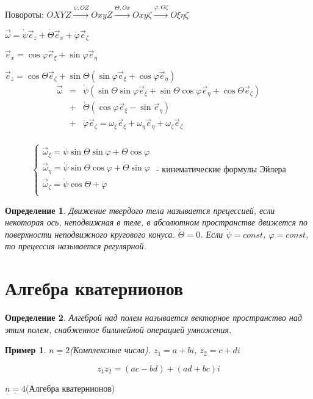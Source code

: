 \documentclass{article}
\newtheorem*{df}{Определение}
\newtheorem*{xmp}{Пример}
\begin{document}
  Повороты:
  $ OXYZ \xrightarrow{\psi, OZ} OxyZ \xrightarrow{\Theta, Ox} Oxy\zeta \xrightarrow{\varphi, O\zeta} O\xi\eta\zeta $

  $\vec{\omega} = \dot{\psi}\vec{e}_z + \dot{\Theta}\vec{e}_x + \dot{\varphi}\vec{e}_{\zeta}$

  $\vec{e}_x = \cos \varphi \vec{e}_{\xi} + \sin \varphi \vec{e}_{\eta}$
  
  $\vec{e}_z = \cos \Theta \vec{e}_{\zeta} + \sin \Theta ( \sin \varphi \vec{e}_{\xi} + \cos \varphi \vec{e}_{\eta} )$
  $$\begin{array}{rcl}\vec{\omega} & = & \dot\psi(\sin \Theta \sin \varphi \vec{e}_{\xi} + \sin \Theta \cos \varphi \vec{e}_{\eta} + \cos \Theta \vec{e}_{\zeta}) \\
  & + & \dot \Theta (\cos \varphi \vec{e}_{\xi} - \sin \vec{e}_{\eta}) \\
  & + & \dot{\varphi}\vec{e}_{\zeta} = \omega_{\xi}\vec{e}_{\xi} + \omega_{\eta}\vec{e}_{\eta} + \omega_{\zeta}\vec{e}_{\zeta} \\
  \end{array}$$

  $$
  \begin{cases}
  \vec{\omega}_{\xi} = \dot{\psi}\sin\Theta \sin\varphi + \dot{\Theta}\cos\varphi \\
  \vec{\omega}_{\eta} = \dot{\psi}\sin\Theta \cos\varphi + \dot{\Theta}\sin\varphi \\
  \vec{\omega}_{\zeta} = \dot{\psi}\cos\Theta + \dot{\varphi} \\
  \end{cases}
  \text{ - кинематические формулы Эйлера}
  $$

  \begin{df} 
  Движение твердого тела называется прецессией, если некоторая ось, неподвижная в теле, в абсолютном пространстве движется по поверхности неподвижного кругового конуса. $\dot{\Theta} = 0$. Если $\dot {\psi} = const$, $\dot {\varphi} = const$, то прецессия называется регулярной.
  \end{df}

  \section{Алгебра кватернионов}
  \begin{df} Алгеброй над полем называется векторное пространство над этим полем, снабженное билинейной операцией умножения. \end{df}
  \begin{xmp} $\underline{n=2}$(Комплексные числа). $z_1 = a + bi$, $z_2 = c + di$ 

  $$ z_1z_2 = (ac - bd) + (ad + bc)i $$

  \end{xmp}
  $\underline{n=4}$(Алгебра кватернионов)
\end{document}
